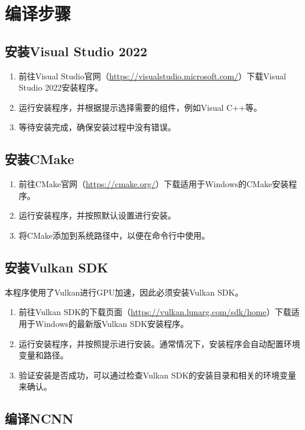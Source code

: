 \section{编译步骤}

\subsection{安装Visual Studio 2022}

\begin{enumerate}
	\item 前往Visual Studio官网（\url{https://visualstudio.microsoft.com/}）下载Visual Studio 2022安装程序。
	\item 运行安装程序，并根据提示选择需要的组件，例如Visual C++等。
	\item 等待安装完成，确保安装过程中没有错误。
\end{enumerate}

\subsection{安装CMake}

\begin{enumerate}
	\item 前往CMake官网（\url{https://cmake.org/}）下载适用于Windows的CMake安装程序。
	\item 运行安装程序，并按照默认设置进行安装。
	\item 将CMake添加到系统路径中，以便在命令行中使用。
\end{enumerate}

\subsection{安装Vulkan SDK}

本程序使用了Vulkan进行GPU加速，因此必须安装Vulkan SDK。

\begin{enumerate}
	\item 前往Vulkan SDK的下载页面（\url{https://vulkan.lunarg.com/sdk/home}）下载适用于Windows的最新版Vulkan SDK安装程序。
	\item 运行安装程序，并按照提示进行安装。通常情况下，安装程序会自动配置环境变量和路径。
	\item 验证安装是否成功，可以通过检查Vulkan SDK的安装目录和相关的环境变量来确认。
\end{enumerate}

\subsection{编译NCNN}

